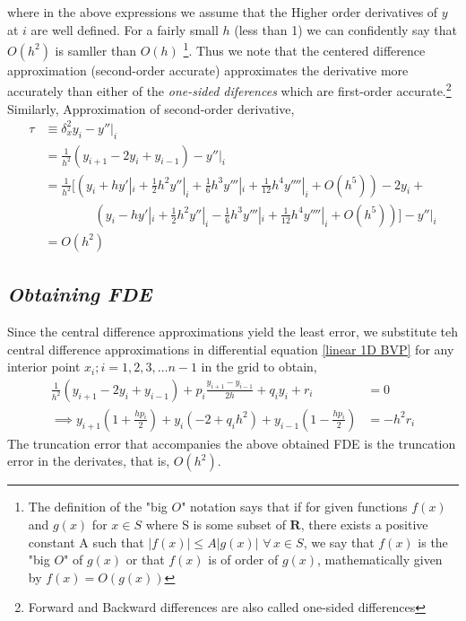 \documentclass[12pt]{article}
\begin{document}
 	where in the above expressions we assume that the Higher order derivatives of $y$ at $i$ are well defined. For a fairly small $h$ (less than 1) we can confidently say that $O(h^2)$ is samller than $O(h)$%
 	\footnote{The definition of the "big $O$" notation says that if for given functions $f(x)$ and $g(x)$ for $x \in S$ where S is some subset of $\mathbf{R}$, there exists a positive constant A such that $|f(x)| \leq A|g(x)|$ $\forall \, x \in S$, we say that $f(x)$ is the "big $O$" of $g(x)$ or that $f(x)$ is of order of $g(x)$, mathematically given by $f(x) = O(g(x))$}. Thus we note that the centered difference approximation (second-order accurate) approximates the derivative more accurately than either of the \textit{one-sided diferences} which are first-order accurate.\footnote{Forward and Backward differences are also called one-sided differences} 	
 	Similarly, Approximation of second-order derivative,
 	\begin{align*}
 		\tau &\equiv \delta^2_x y_i - y''|_i \\
 		&= \frac{1}{h^2}(y_{i+1}-2 y_i + y_{i-1})  - y''|_i \\
 		&= \frac{1}{h^2}\Bigg[ \left( y_i + h{y'}|_ i + \frac{1}{2}h^2{y''}|_ i + \frac{1}{6}h^3{y'''}|_ i + \frac{1}{12}h^4{y''''}|_ i + O(h^5)\right) - 2 y_i +\\ &\qquad\qquad \left( y_i - h{y'}|_ i + \frac{1}{2}h^2{y''}|_ i - \frac{1}{6}h^3{y'''}|_ i + \frac{1}{12}h^4{y''''}|_ i +O(h^5)\right)\Bigg] - {y''}|_ i \\
 		&= O(h^2)
 	\end{align*}
 	\subsection{\textit{Obtaining FDE}}
 	
 	Since the central difference approximations yield the least error, we substitute teh central difference approximations in differential equation \ref{linear 1D BVP} for any interior point $ x_i ; i = 1,2,3,\dots n-1$ in the grid to obtain,
 	\begin{align}\label{Difference Equation}
 		 \frac{1}{h^2}(y_{i+1}-2 y_i + y_{i-1}) + p_i \frac{y_{i+1} - y_{i-1}}{2h} + q_i y_i + r_i &= 0 \nonumber\\
 		 \implies y_{i+1}\left(1+\frac{h p_i}{2}\right) + y_{i}\left(-2+q_i h^2\right)+y_{i-1}\left(1-\frac{h p_i}{2}\right) &= -h^2r_i 
 	\end{align}
 	The truncation error that accompanies the above obtained FDE is the truncation error in the derivates, that is, $ O(h^2) $.
\end{document}
